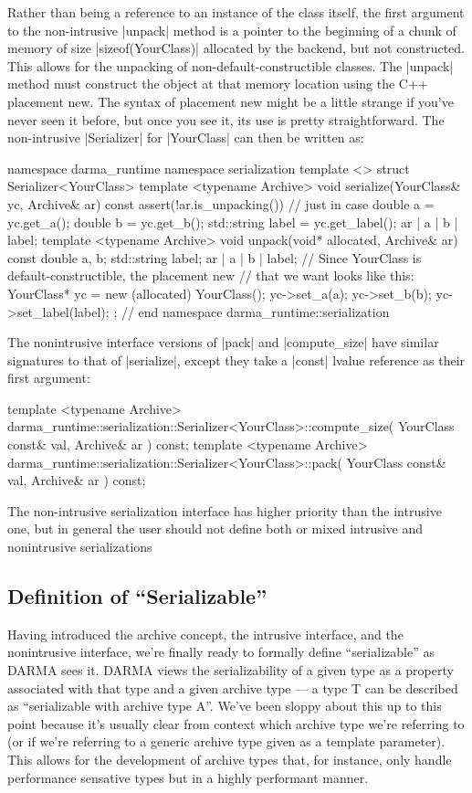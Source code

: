 Rather than being a reference to an instance of the class itself, the first
argument to the non-intrusive |unpack| method is a pointer to the beginning of a
chunk of memory of size |sizeof(YourClass)| allocated by the backend, but not
constructed.  This allows for the unpacking of non-default-constructible
classes.  The |unpack| method must construct the object at that memory
location using the C++ placement new.  The syntax of placement new might be a
little strange if you've never seen it before, but once you see it, its use is
pretty straightforward.  The non-intrusive |Serializer| for |YourClass| can then
be written as:
\begin{CppCodeNumb}
namespace darma_runtime { namespace serialization {
template <>
struct Serializer<YourClass> {
  template <typename Archive>
  void serialize(YourClass& yc, Archive& ar) const {
    assert(!ar.is_unpacking()) // just in case
    double a = yc.get_a();
    double b = yc.get_b();
    std::string label = yc.get_label();
    ar | a | b | label;
  }
  template <typename Archive>
  void unpack(void* allocated, Archive& ar) const {
    double a, b;
    std::string label;
    ar | a | b | label;
    // Since YourClass is default-constructible, the placement new
    // that we want looks like this:
    YourClass* yc = new (allocated) YourClass();
    yc->set_a(a);
    yc->set_b(b);
    yc->set_label(label);
  }
};
}} // end namespace darma_runtime::serialization
\end{CppCodeNumb}
The nonintrusive interface versions of |pack| and |compute_size| have similar
signatures to that of |serialize|, except they take a |const| lvalue reference
as their first argument:
\begin{CppCodeNumb}
template <typename Archive>
darma_runtime::serialization::Serializer<YourClass>::compute_size(
  YourClass const& val, Archive& ar
) const;
template <typename Archive>
darma_runtime::serialization::Serializer<YourClass>::pack(
  YourClass const& val, Archive& ar
) const;
\end{CppCodeNumb}

The non-intrusive serialization interface has higher priority than the intrusive
one, but in general the user should not define both or mixed intrusive and
nonintrusive serializations

\subsection{Definition of ``Serializable''}

Having introduced the archive concept, the intrusive interface, and the
nonintrusive interface, we're finally ready to formally define ``serializable''
as DARMA sees it.  DARMA views the serializability of a given type as a property
associated with that type and a given archive type --- a type T can be described
as ``serializable with archive type A''.  We've been sloppy about this up to
this point because it's usually clear from context which archive type we're
referring to (or if we're referring to a generic archive type given as a
template parameter).  This allows for the development of archive types that, for
instance, only handle performance sensative types but in a highly performant
manner.  

